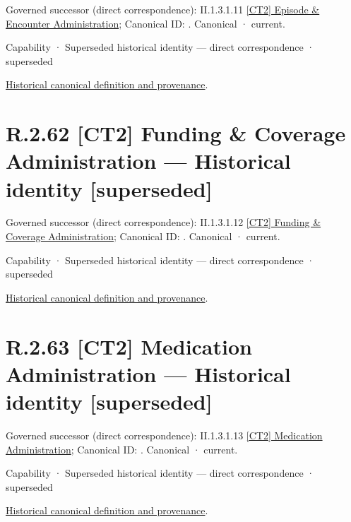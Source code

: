 {\small Governed successor (direct correspondence): II.1.3.1.11 \hyperref[element:61d7067aee0540259b3daca4287d66d2]{[CT2] Episode \& Encounter Administration}; Canonical ID: \texttt{}. Canonical · current.}\par
\label{element:2778f988e8d44e3091749542c39d38a4}
{\small Capability · Superseded historical identity — direct correspondence · superseded}\par
\href{../../../../../../../continuum/strategy/capability/2778f988e8d44e3091749542c39d38a4.md}{Historical canonical definition and provenance}.\par
\section*{R.2.62 [CT2] Funding \& Coverage Administration — Historical identity [superseded]}
\label{navigation:R.2.62}

{\small Governed successor (direct correspondence): II.1.3.1.12 \hyperref[element:640432d413cf47928ea2b3d221f92313]{[CT2] Funding \& Coverage Administration}; Canonical ID: \texttt{}. Canonical · current.}\par
\label{element:58beafcbcd084331be710eb00d27f6cf}
{\small Capability · Superseded historical identity — direct correspondence · superseded}\par
\href{../../../../../../../continuum/strategy/capability/58beafcbcd084331be710eb00d27f6cf.md}{Historical canonical definition and provenance}.\par
\section*{R.2.63 [CT2] Medication Administration — Historical identity [superseded]}
\label{navigation:R.2.63}

{\small Governed successor (direct correspondence): II.1.3.1.13 \hyperref[element:c907e2a95629435b9951941ad4e2ebe9]{[CT2] Medication Administration}; Canonical ID: \texttt{}. Canonical · current.}\par
\label{element:5a38bf2527a8404bac714121f2dc76a9}
{\small Capability · Superseded historical identity — direct correspondence · superseded}\par
\href{../../../../../../../continuum/strategy/capability/5a38bf2527a8404bac714121f2dc76a9.md}{Historical canonical definition and provenance}.\par

